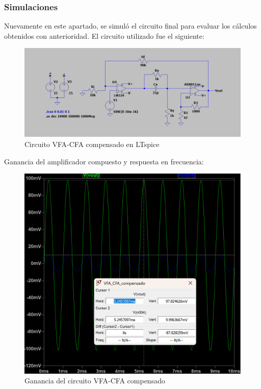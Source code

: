 \documentclass[a4paper,12pt]{article}
\begin{document}
\subsubsection{Simulaciones}
\hspace{0,2cm}
\hspace{1mm}Nuevamente en este apartado, se simul\'o el circuito final para evaluar los cálculos obtenidos con anterioridad. El circuito utilizado fue el siguiente:
\begin{figure}
    \centering
    \includegraphics[width=1\linewidth]{Circuito_VFA-CFA-II.png}
    \caption{Circuito VFA-CFA compensado en LTspice}
    \label{fig:enter-label}
\end{figure}
\hspace{1mm}Ganancia del amplificador compuesto y respuesta en frecuencia:
\begin{figure}
    \centering
    \includegraphics[width=0.7\linewidth]{Ganancia_VFA-CFA-II.png}
    \caption{Ganancia del circuito VFA-CFA compensado}
    \label{fig:enter-label}
\end{figure}
\end{document}
